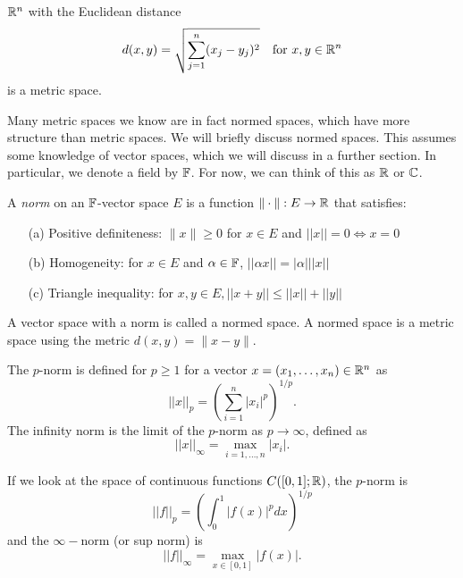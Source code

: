 \documentclass{article}
\begin{document}
\begin{example}
${\mathbb{R}}^n$ with the Euclidean distance 
\begin{equation*}
    d(x,y) = \sqrt{\sum_{j=1}^n (x_j - y_j)^2} \quad \text{for } x,y \in {\mathbb{R}}^n
\end{equation*}
is a metric space.
\end{example}

Many metric spaces we know are in fact normed spaces, which have more structure than metric spaces. We will briefly discuss normed spaces. This assumes some knowledge of vector spaces, which we will discuss in a further section. In particular, we denote a field by ${\mathbb{F}}$. For now, we can think of this as ${\mathbb{R}}$ or ${\mathbb{C}}$.

\begin{definition}
A \emph{norm} on an ${\mathbb{F}}$-vector space $E$ is a function $\|\cdot\|:E \to {\mathbb{R}}$ that satisfies:
\begin{enumerate}
    \item[(a)] Positive definiteness: $\|x\| \geq 0$ for $x \in E$ and $||x|| = 0 \Leftrightarrow x = 0$
    \item[(b)] Homogeneity: for $x \in E$ and $\alpha \in {\mathbb{F}}$, $||\alpha x || = |\alpha| ||x||$
    \item[(c)] Triangle inequality: for $x,y \in E, ||x+y|| \leq ||x|| + ||y||$
\end{enumerate}
A vector space with a norm is called a normed space. A normed space is a metric space using the metric $d(x,y) = \| x-y \|$.
\end{definition}

\begin{example}
\label{p-norm} 
The $p$-norm is defined for $p \geq 1$ for a vector $x = (x_1, \ldots, x_n) \in {\mathbb{R}}^n$ as
\begin{equation*}
    ||x||_p = \left( \sum_{i=1}^n |x_i|^p \right)^{1/p}.
\end{equation*}
The infinity norm is the limit of the $p$-norm as $p \to \infty$, defined as
\begin{equation*}
    ||x||_\infty = \max_{i=1,\ldots, n} |x_i|.
\end{equation*}

If we look at the space of continuous functions $C([0,1];{\mathbb{R}})$, the $p$-norm is 
\begin{equation*}
    ||f||_p = \left( \int_0^1 |f(x)|^p dx \right)^{1/p}
\end{equation*}
and the $\infty-$norm (or sup norm) is 
\begin{equation*}
    ||f||_\infty = \max_{x \in [0,1]} |f(x)|.
\end{equation*}
\end{example}
\end{document}
